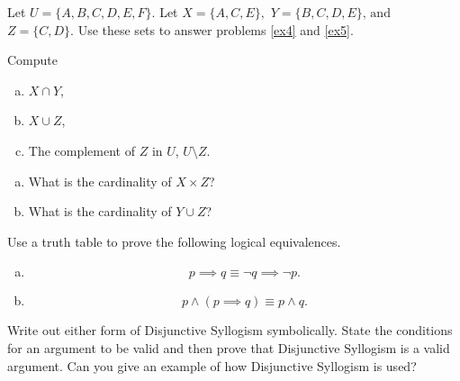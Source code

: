 \documentclass[12pt]{amsart}
\begin{document}
\noindent Let $U = \{A, B, C, D, E, F\}$.
Let 
$X = \{A,C,E\},$
$Y = \{B, C, D, E\},\, \text{and}$
$Z = \{C, D\}.$
Use these sets to answer problems \ref{ex4} and \ref{ex5}.
\begin{thm}[18 Points]\label{ex4}
  Compute
  \begin{enumerate}[(a)]
  \item
    $X \cap Y$,
    \vspace{2.5in}
  \item
    $X \cup Z$,
    \vspace{2.5in}
  \item
    The complement of $Z$ in $U$, $U \setminus Z$.
  \end{enumerate}
\end{thm}

\newpage

\begin{thm}[20 Points]\label{ex5}
  \begin{enumerate}[(a)]
  \item
    What is the cardinality of $X \times Z$?
    \vspace{4in}
  \item
    What is the cardinality of $Y \cup Z$?
  \end{enumerate}
\end{thm}

\newpage

\begin{thm}[20 Points]\label{ex9}
  Use a truth table to prove the following logical equivalences.
  \begin{enumerate}[(a)]
  \item
    $$p \implies q \equiv \neg q \implies \neg p.$$
    \vspace{4in}
  \item
    $$p \wedge (p \implies q) \equiv p \wedge q.$$
  \end{enumerate}
\end{thm}

\newpage

\begin{thm}\label{bonus}
  Write out either form of Disjunctive Syllogism symbolically.
  State the conditions for an argument to be valid and then prove that Disjunctive Syllogism is a valid argument.
  Can you give an example of how Disjunctive Syllogism is used?
\end{thm}
\end{document}
